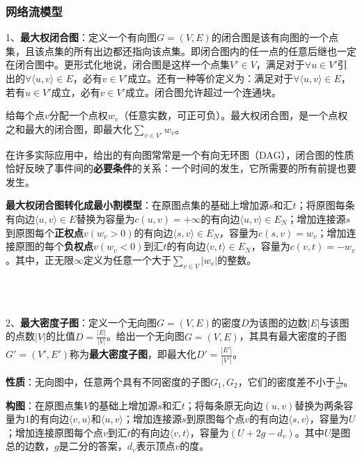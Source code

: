 \subsubsection{网络流模型}
1、\textbf{最大权闭合图}：定义一个有向图$G=(V,E)$的闭合图是该有向图的一个点集，且该点集的所有出边都还指向该点集。即闭合图内的任一点的任意后继也一定在闭合图中。更形式化地说，闭合图是这样一个点集$V' \in V$，满足对于$\forall u \in V'$引出的$\forall \langle u,v \rangle \in E$，必有$v \in V'$成立。还有一种等价定义为：满足对于$\forall \langle u,v \rangle \in E$，若有$u \in V'$成立，必有$v \in V'$成立。闭合图允许超过一个连通块。\par
给每个点$v$分配一个点权$w_v$（任意实数，可正可负）。最大权闭合图，是一个点权之和最大的闭合图，即最大化$\sum_{v \in V'}w_v$。\par
在许多实际应用中，给出的有向图常常是一个有向无环图（DAG），闭合图的性质恰好反映了事件间的\textbf{必要条件}的关系：一个时间的发生，它所需要的所有前提也要发生。\par
\textbf{最大权闭合图转化成最小割模型}：在原图点集的基础上增加源$s$和汇$t$；将原图每条有向边$\langle u,v \rangle \in E$替换为容量为$c(u,v)=+\infty$的有向边$\langle u,v \rangle \in E_N$；增加连接源$s$到原图每个\textbf{正权点}$v(w_v>0)$的有向边$\langle s,v \rangle \in E_N$，容量为$c(s,v)=w_v$；增加连接原图的每个\textbf{负权点}$v(w_v<0)$到汇$t$的有向边$\langle v,t \rangle \in E_N$，容量为$c(v,t)=-w_v$。其中，正无限$\infty$定义为任意一个大于$\sum_{v\in V}|w_v|$的整数。

~\\
~\\ \par
2、\textbf{最大密度子图}：定义一个无向图$G=(V,E)$的密度$D$为该图的边数$|E|$与该图的点数$|V|$的比值$D=\frac{|E|}{|V|}$。给出一个无向图$G=(V,E)$，其具有最大密度的子图$G'=(V',E')$称为\textbf{最大密度子图}，即最大化$D'=\frac{|E'|}{|V'|}$。\par
\textbf{性质}：无向图中，任意两个具有不同密度的子图$G_1,G_2$，它们的密度差不小于$\frac{1}{n^2}$。\par
\textbf{构图}：在原图点集$V$的基础上增加源$s$和汇$t$；将每条原无向边$(u,v)$替换为两条容量为1的有向边$\langle v,u \rangle$和$\langle u,v \rangle$；增加连接源$s$到原图每个点$v$的有向边$\langle s,v \rangle$，容量为$U$；增加连接原图每个点$v$到汇$t$的有向边$\langle v,t \rangle$，容量为$(U+2g-d_v)$。其中$U$是图总的边数，$g$是二分的答案，$d_v$表示顶点$v$的度。


